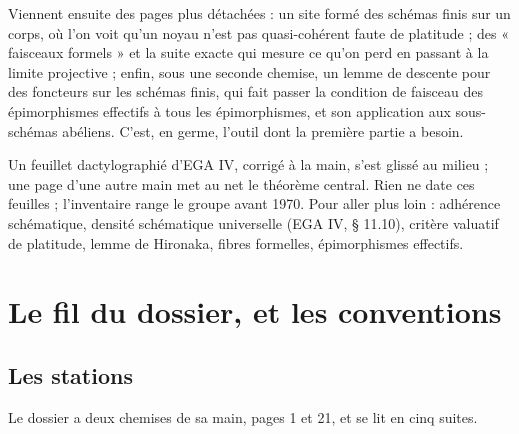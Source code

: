 \documentclass[11pt,a4paper]{article}
\begin{document}
\begin{resume}
Viennent ensuite des pages plus détachées : un site formé des schémas finis
sur un corps, où l'on voit qu'un noyau n'est pas quasi-cohérent faute de
platitude ; des « faisceaux formels » et la suite exacte qui mesure ce qu'on
perd en passant à la limite projective ; enfin, sous une seconde chemise, un
lemme de descente pour des foncteurs sur les schémas finis, qui fait passer
la condition de faisceau des épimorphismes effectifs à tous les
épimorphismes, et son application aux sous-schémas abéliens. C'est, en
germe, l'outil dont la première partie a besoin.

Un feuillet dactylographié d'EGA IV, corrigé à la main, s'est glissé au
milieu ; une page d'une autre main met au net le théorème central. Rien ne
date ces feuilles ; l'inventaire range le groupe avant 1970. Pour aller plus
loin : adhérence schématique, densité schématique universelle (EGA IV, §
11.10), critère valuatif de platitude, lemme de Hironaka, fibres formelles,
épimorphismes effectifs.

\end{resume}

\section*{Le fil du dossier, et les conventions}

\subsection*{Les stations}

Le dossier a deux chemises de sa main, pages 1 et 21, et se lit en cinq
suites.
\end{document}
